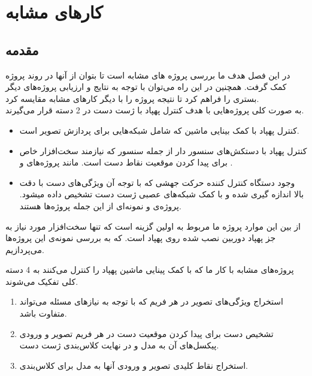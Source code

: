 \chapter{کار‌های مشابه}
\section{مقدمه}
در این فصل هدف ما بررسی پروژه های مشابه است تا بتوان از آنها در روند پروژه کمک گرفت. همچنین در این راه می‌توان با توجه به نتایج و ارزیابی پروژه‌های دیگر بستری را فراهم کرد تا نتیجه پروژه را با دیگر کارهای مشابه مقایسه کرد.
\\
به صورت کلی پروژه‌هایی با هدف کنترل پهپاد با ژست دست در 2 دسته قرار می‌گیرند.
\begin{itemize}
    \item کنترل پهپاد با کمک بینایی ماشین که شامل شبکه‌هایی برای پردازش تصویر است. 
    \item کنترل پهپاد با دستکش‌های سنسور دار از جمله سنسور  که نیازمند سخت‌افزار خاص برای پیدا کردن موقعیت نقاط دست است. مانند پروژه‌های  \cite{yoo2022motion} و  \cite{ma2017hand}.
    \item وجود دستگاه کنترل کننده حرکت جهشی که با توجه آن ویژگی‌های دست با دقت بالا اندازه گیری شده و با کمک شبکه‌های عصبی ژست دست تشخیص داده میشود. پروژه‌ی
     \cite{hu2020deep} و  \cite{sarkar2016gesture} نمونه‌ای از این جمله پروژه‌ها هستند. 
\end{itemize}

از بین این موارد پروژه ما مربوط به اولین گزینه است که تنها سخت‌افزار مورد نیاز به جز پهپاد دوربین نصب شده روی پهپاد است. که به بررسی نمونه‌ی این پروژه‌ها می‌پردازیم.

پروژه‌های مشابه با کار ما که با کمک پینایی ماشین پهپاد را کنترل می‌‌کنند به 4 دسته کلی تفکیک می‌شوند.
\begin{enumerate}
    \item استخراج ویژگی‌های تصویر در هر فریم که با توجه به نیاز‌های مسئله می‌تواند متفاوت باشد.
    \item تشخیص دست ‌برای پیدا کردن موقعیت دست در هر فریم تصویر و ورودی پیکسل‌های  آن به مدل و در نهایت کلاس‌بندی ژست دست.
    \item استخراج نقاط کلیدی  تصویر و ورودی آنها به مدل برای کلاس‌بندی.

\end{enumerate}

